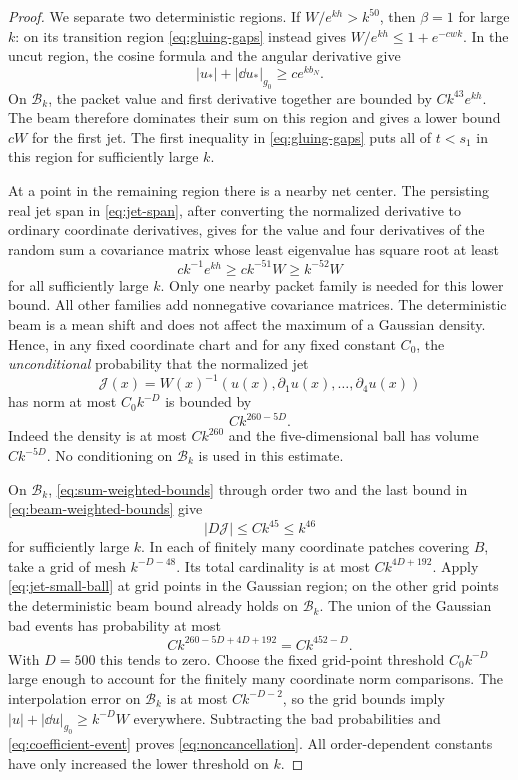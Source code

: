 \begin{proof}
We separate two deterministic regions. If $W/e^{kh}>k^{50}$, then
$\beta=1$ for large $k$: on its transition region
\eqref{eq:gluing-gaps} instead gives $W/e^{kh}\le1+e^{-cw k}$.
In the uncut region, the cosine formula and the angular derivative
give
\[
 |u_*|+|\dd u_*|_{g_0}\ge c e^{kb_N}.
\]
On $\mathcal B_k$, the packet value and first derivative together are
bounded by $Ck^{43}e^{kh}$. The beam therefore dominates their sum
on this region and gives a lower bound $cW$ for the first jet.
The first inequality in \eqref{eq:gluing-gaps} puts all of $t<s_1$
in this region for sufficiently large $k$.

At a point in the remaining region there is a nearby net center.
The persisting real jet span in \eqref{eq:jet-span}, after converting
the normalized derivative to ordinary coordinate derivatives, gives
for the value and four derivatives of the random sum a covariance
matrix whose least eigenvalue has square root at least
\[
 c k^{-1}e^{kh}\ge c k^{-51}W\ge k^{-52}W
\]
for all sufficiently large $k$. Only one nearby packet family is
needed for this lower bound. All other families add nonnegative
covariance matrices. The deterministic beam is a mean shift and
does not affect the maximum of a Gaussian density. Hence, in any
fixed coordinate chart and for any fixed constant $C_0$, the
\emph{unconditional} probability that the normalized jet
\[
 \mathcal J(x)=W(x)^{-1}(u(x),\partial_1u(x),\ldots,\partial_4u(x))
\]
has norm at most $C_0k^{-D}$ is bounded by
\begin{equation}\label{eq:jet-small-ball}
 C k^{260-5D}.
\end{equation}
Indeed the density is at most $Ck^{260}$ and the five-dimensional
ball has volume $Ck^{-5D}$. No conditioning on $\mathcal B_k$ is used
in this estimate.

On $\mathcal B_k$, \eqref{eq:sum-weighted-bounds} through order two
and the last bound in \eqref{eq:beam-weighted-bounds} give
\[
 |D\mathcal J|\le Ck^{45}\le k^{46}
\]
for sufficiently large $k$. In each of finitely many coordinate
patches covering $B$, take a grid of mesh $k^{-D-48}$. Its total
cardinality is at most $Ck^{4D+192}$. Apply
\eqref{eq:jet-small-ball} at grid points in the Gaussian region;
on the other grid points the deterministic beam bound already holds
on $\mathcal B_k$. The union of the Gaussian bad events has
probability at most
\[
 C k^{260-5D+4D+192}=Ck^{452-D}.
\]
With $D=500$ this tends to zero. Choose the fixed grid-point
threshold $C_0k^{-D}$ large enough to account for the finitely many
coordinate norm comparisons. The interpolation error on
$\mathcal B_k$ is at most $Ck^{-D-2}$, so the grid bounds imply
$|u|+|\dd u|_{g_0}\ge k^{-D}W$ everywhere. Subtracting the bad
probabilities and \eqref{eq:coefficient-event} proves
\eqref{eq:noncancellation}. All order-dependent constants have only
increased the lower threshold on $k$.
\end{proof}

